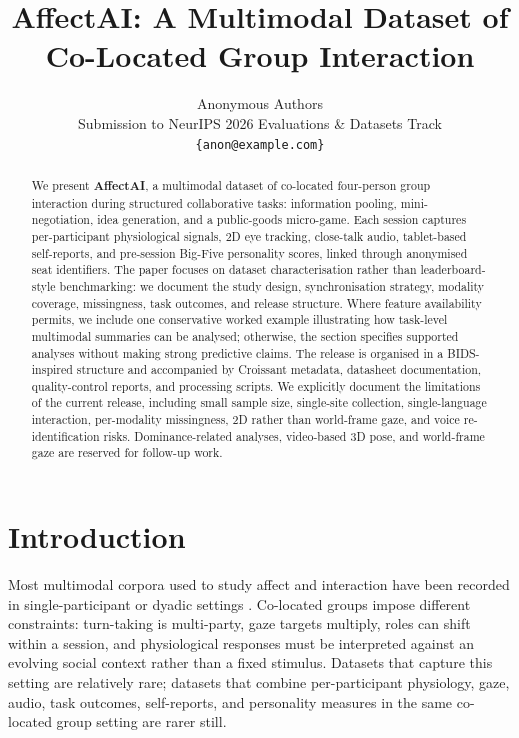 \documentclass{article}
\title{AffectAI: A Multimodal Dataset of Co-Located Group Interaction}
\author{%
  Anonymous Authors\\
  Submission to NeurIPS 2026 Evaluations \& Datasets Track\\
  \texttt{\{anon@example.com\}}%
}
\begin{document}
\maketitle

\begin{abstract}
We present \textbf{AffectAI}, a multimodal dataset of co-located
four-person group interaction during structured collaborative tasks:
information pooling, mini-negotiation, idea generation, and a public-goods
micro-game.
Each session captures per-participant physiological signals, 2D eye tracking,
close-talk audio, tablet-based self-reports, and pre-session Big-Five
personality scores, linked through anonymised seat identifiers.
The paper focuses on dataset characterisation rather than leaderboard-style
benchmarking: we document the study design, synchronisation strategy,
modality coverage, missingness, task outcomes, and release structure.
Where feature availability permits, we include one conservative worked example
illustrating how task-level multimodal summaries can be analysed; otherwise,
the section specifies supported analyses without making strong predictive
claims.
The release is organised in a BIDS-inspired structure and accompanied by
Croissant metadata, datasheet documentation, quality-control reports, and
processing scripts.
We explicitly document the limitations of the current release, including
small sample size, single-site collection, single-language interaction,
per-modality missingness, 2D rather than world-frame gaze, and voice
re-identification risks.
Dominance-related analyses, video-based 3D pose, and world-frame gaze are
reserved for follow-up work.
\end{abstract}

\section{Introduction}
\label{sec:intro}

Most multimodal corpora used to study affect and interaction have been
recorded in single-participant or dyadic settings
\cite{ringeval2013introducing,busso2008iemocap,koelstra2012deap}.
Co-located groups impose different constraints: turn-taking is multi-party,
gaze targets multiply, roles can shift within a session, and physiological
responses must be interpreted against an evolving social context rather than
a fixed stimulus.
Datasets that capture this setting are relatively rare; datasets that combine
per-participant physiology, gaze, audio, task outcomes, self-reports, and
personality measures in the same co-located group setting are rarer still.
\end{document}
